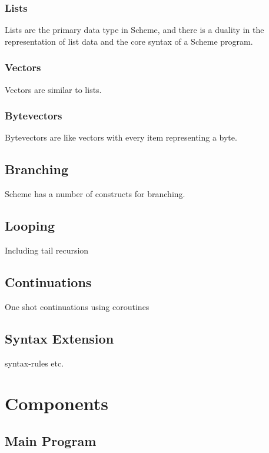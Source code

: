 \subsubsection{Lists}

Lists are the primary data type in Scheme, and there is a duality in the
representation of list data and the core syntax of a Scheme program.

\subsubsection{Vectors}

Vectors are similar to lists.

\subsubsection{Bytevectors}

Bytevectors are like vectors with every item representing a byte.

\subsection{Branching}

Scheme has a number of constructs for branching.

\subsection{Looping}

Including tail recursion

\subsection{Continuations}

One shot continuations using coroutines

\subsection{Syntax Extension}

syntax-rules etc.


\section{Components}

\subsection{Main Program}

